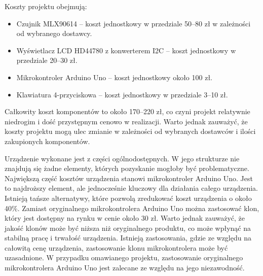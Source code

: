Koszty projektu obejmują: 

\begin{itemize}
    \item Czujnik MLX90614 – koszt jednostkowy w przedziale 50–80 zł w zależności od wybranego dostawcy.
    \item Wyświetlacz LCD HD44780 z konwerterem I2C – koszt jednostkowy w przedziale 20–30 zł.
    \item Mikrokontroler Arduino Uno – koszt jednostkowy około 100 zł.
    \item Klawiatura 4-przyciskowa – koszt jednostkowy w przedziale 3–10 zł. 
\end{itemize}

Całkowity koszt komponentów to około 170–220 zł, co czyni projekt relatywnie niedrogim i dość przystępnym cenowo w realizacji. Warto jednak zauważyć, że koszty projektu mogą ulec zmianie w zależności od wybranych dostawców i ilości zakupionych komponentów. 

\vspace{12pt}

Urządzenie wykonane jest z części ogólnodostępnych. W jego strukturze nie znajdują się żadne elementy, których pozyskanie mogłoby być problematyczne. Największą część kosztów urządzenia stanowi mikrokontroler Arduino Uno. Jest to najdroższy element, ale jednocześnie kluczowy dla działania całego urządzenia. Istnieją tańsze alternatywy, które pozwolą zredukować koszt urządzenia o około 40\%. Zamiast oryginalnego mikrokontrolera Arduino Uno można zastosować klon, który jest dostępny na rynku w cenie około 30 zł. Warto jednak zauważyć, że jakość klonów może być niższa niż oryginalnego produktu, co może wpłynąć na stabilną pracę i trwałość urządzenia. Istnieją zastosowania, gdzie ze względu na całowitą cenę urządzenia, zastosowanie klonu mikrokontrolera może być uzasadnione. W przypadku omawianego projektu, zastosowanie oryginalnego mikrokontrolera Arduino Uno jest zalecane ze względu na jego niezawodność.